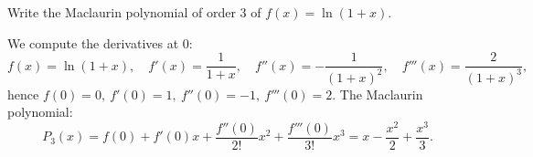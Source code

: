 
\begin{question}
Write the Maclaurin polynomial of order 3 of $f(x)=\ln(1+x)$.
\end{question}

\begin{solution}
We compute the derivatives at $0$:
\[ f(x)=\ln(1+x),\quad f'(x)=\frac1{1+x},\quad f''(x)=-\frac1{(1+x)^2},\quad f'''(x)=\frac{2}{(1+x)^3}, \]
hence $f(0)=0,\ f'(0)=1,\ f''(0)=-1,\ f'''(0)=2$. The Maclaurin polynomial:
\[ P_3(x)=f(0)+f'(0)x+\frac{f''(0)}{2!}x^2+\frac{f'''(0)}{3!}x^3=\boxed{x-\frac{x^2}{2}+\frac{x^3}{3}}. \]
\end{solution}
